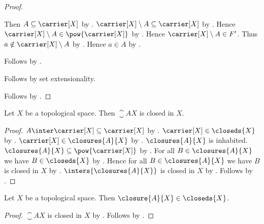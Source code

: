 \begin{proof}
\begin{subproof}
\begin{subproof}
\begin{subproof}
                Then $A\subseteq\carrier[X]$
                    by .
                $\carrier[X]\setminus A\subseteq\carrier[X]$
                    by .
                Hence $\carrier[X]\setminus A\in\pow{\carrier[X]}$
                    by .
                Hence $\carrier[X]\setminus A\in F'$.
                Thus $a\notin\carrier[X]\setminus A$
                    by .
                Hence $a\in A$ by .
            \end{subproof}
            Follows by .
        \end{subproof}
        Follows by set extensionality.
    \end{subproof}
    Follows by .
\end{proof}

\begin{proposition}\label{closure_is_closed}
    Let $X$ be a topological space.
    Then $\closure{A}{X}$ is closed in $X$.
\end{proposition}
\begin{proof}
    $A\inter\carrier[X]\subseteq\carrier[X]$
        by .
    $\carrier[X]\in\closeds{X}$ by
        .
    $\carrier[X]\in\closures{A}{X}$
        by .
    $\closures{A}{X}$ is inhabited.
    $\closures{A}{X}\subseteq\pow{\carrier[X]}$ by .
    For all $B\in\closures{A}{X}$ we have $B\in\closeds{X}$
        by .
    Hence for all $B\in\closures{A}{X}$ we have $B$ is closed in $X$
        by .
    $\inters{\closures{A}{X}}$ is closed in $X$
        by .
    Follows by .
\end{proof}

\begin{corollary}\label{closure_elem_closeds}
    Let $X$ be a topological space.
    Then $\closure{A}{X}\in\closeds{X}$.
\end{corollary}
\begin{proof}
    $\closure{A}{X}$ is closed in $X$ by .
    Follows by .
\end{proof}



